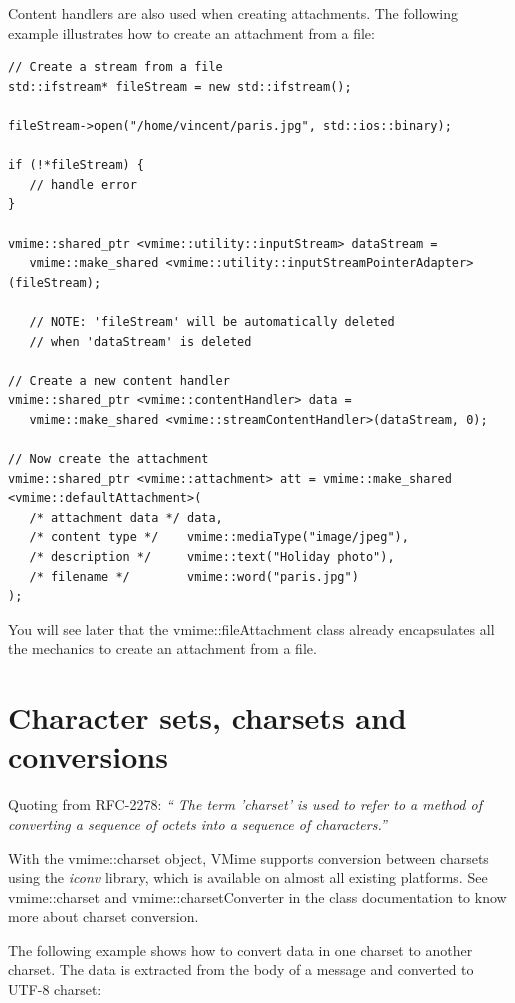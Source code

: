 Content handlers are also used when creating attachments. The following
example illustrates how to create an attachment from a file:

\begin{lstlisting}[caption={Creating an attachment from a file}]
// Create a stream from a file
std::ifstream* fileStream = new std::ifstream();

fileStream->open("/home/vincent/paris.jpg", std::ios::binary);

if (!*fileStream) {
   // handle error
}

vmime::shared_ptr <vmime::utility::inputStream> dataStream =
   vmime::make_shared <vmime::utility::inputStreamPointerAdapter>(fileStream);

   // NOTE: 'fileStream' will be automatically deleted
   // when 'dataStream' is deleted

// Create a new content handler
vmime::shared_ptr <vmime::contentHandler> data =
   vmime::make_shared <vmime::streamContentHandler>(dataStream, 0);

// Now create the attachment
vmime::shared_ptr <vmime::attachment> att = vmime::make_shared <vmime::defaultAttachment>(
   /* attachment data */ data,
   /* content type */    vmime::mediaType("image/jpeg"),
   /* description */     vmime::text("Holiday photo"),
   /* filename */        vmime::word("paris.jpg")
);
\end{lstlisting}

You will see later that the {\vcode vmime::fileAttachment} class already
encapsulates all the mechanics to create an attachment from a file.


\section{Character sets, charsets and conversions\label{section_charsets}}

Quoting from RFC-2278: \emph{`` The term 'charset' is used to refer to a
method of converting a sequence of octets into a sequence of characters.''}

With the {\vcode vmime::charset} object, VMime supports conversion between
charsets using the {\em iconv} library, which is available on almost all
existing platforms. See {\vcode vmime::charset} and
{\vcode vmime::charsetConverter} in the class documentation to know more
about charset conversion.

The following example shows how to convert data in one charset to another
charset. The data is extracted from the body of a message and converted
to UTF-8 charset:

